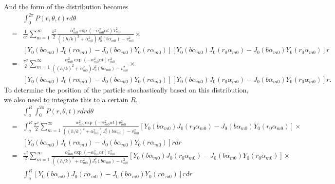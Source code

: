 \documentclass{article}
\begin{document}
%
And the form of the distribution becomes
%
\begin{eqnarray}
    & & \int_0^{2\pi} P(r, \theta, t) rd\theta
\nonumber\\
    &=& \frac{1}{a^2} \sum_{m=1}^{\infty}
    \frac{\pi^2}{2}
    \frac{\alpha_{m0}^2\exp(-\alpha_{m0}^2\alpha t)V_{m0}^2}
         {((h/k)^2 + \alpha_{m0}^2)J_0^2(b\alpha_{m0}) - v_{m0}^2} \times
\nonumber\\
    & & \left[Y_0(b\alpha_{m0})J_0(r  \alpha_{m0}) - J_0(b\alpha_{m0})Y_0(r  \alpha_{m0})\right]
        \left[Y_0(b\alpha_{m0})J_0(r_0\alpha_{m0}) - J_0(b\alpha_{m0})Y_0(r_0\alpha_{m0})\right] r
\nonumber\\
    &=& \frac{\pi^2}{2} \sum_{m=1}^{\infty}
    \frac{\alpha_{m0}^2\exp(-\alpha_{m0}^2\alpha t)v_{m0}^2}
         {((h/k)^2 + \alpha_{m0}^2)J_0^2(b\alpha_{m0}) - v_{m0}^2} \times
\nonumber\\
    & & \left[Y_0(b\alpha_{m0})J_0(r  \alpha_{m0}) - J_0(b\alpha_{m0})Y_0(r  \alpha_{m0})\right]
        \left[Y_0(b\alpha_{m0})J_0(r_0\alpha_{m0}) - J_0(b\alpha_{m0})Y_0(r_0\alpha_{m0})\right] r.
\end{eqnarray}
%
To determine the position of the particle stochastically based on
this distribution, we also need to integrate this to a certain $R$.
%
\begin{eqnarray}
    & & \int_a^R \int_0^{2\pi} P(r, \theta, t) rdrd\theta
\nonumber\\
    &=& \int_a^R \frac{\pi^2}{2} \sum_{m=1}^{\infty}
    \frac{\alpha_{m0}^2\exp(-\alpha_{m0}^2\alpha t)v_{m0}^2}
         {((h/k)^2 + \alpha_{m0}^2)J_0^2(b\alpha_{m0}) - v_{m0}^2}
    \left[Y_0(b\alpha_{m0})J_0(r_0\alpha_{m0}) - J_0(b\alpha_{m0})Y_0(r_0\alpha_{m0})\right]
    \times
\nonumber\\
    & & \left[Y_0(b\alpha_{m0})J_0(r  \alpha_{m0}) - J_0(b\alpha_{m0})Y_0(r  \alpha_{m0})\right]rdr
\nonumber\\
    &=& \frac{\pi^2}{2} \sum_{m=1}^{\infty}
    \frac{\alpha_{m0}^2\exp(-\alpha_{m0}^2\alpha t)v_{m0}^2}
         {((h/k)^2 + \alpha_{m0}^2)J_0^2(b\alpha_{m0}) - v_{m0}^2}
    \left[Y_0(b\alpha_{m0})J_0(r_0\alpha_{m0}) - J_0(b\alpha_{m0})Y_0(r_0\alpha_{m0})\right]
    \times
\nonumber\\
    & & \int_a^R \left[Y_0(b\alpha_{m0})J_0(r  \alpha_{m0}) - J_0(b\alpha_{m0})Y_0(r  \alpha_{m0})\right]rdr
\end{eqnarray}
\end{document}
